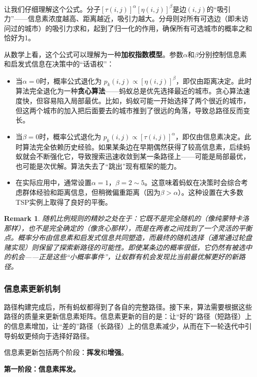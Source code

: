 \documentclass[lang=cn,zihao=-4,a4paper,fontset=windows]{beautybook}
\newtheorem*{remark}{\textbf{Remark}}
\begin{document}
让我们仔细理解这个公式。分子$[\tau(i,j)]^\alpha [\eta(i,j)]^\beta$是边$(i,j)$的“吸引力”——信息素浓度越高、距离越近，吸引力越大。分母则对所有可选边（即未访问过的城市）的吸引力求和，起到了归一化的作用，确保所有可选城市的概率之和恰好为1。

从数学上看，这个公式可以理解为一种\textbf{加权指数模型}。参数$\alpha$和$\beta$分别控制信息素和启发式信息在决策中的“话语权”：
\begin{itemize}
    \item 当$\alpha = 0$时，概率公式退化为 $p_k(i,j) \propto [\eta(i,j)]^\beta$，即仅由距离决定。此时算法完全退化为一种\textbf{贪心算法}——蚂蚁总是优先选择最近的城市。贪心算法速度快，但容易陷入局部最优。比如，蚂蚁可能一开始选择了两个很近的城市，但这两个城市的加入把后面要去的城市推到了很远的角落，导致总路径反而变长。
    \item 当$\beta = 0$时，概率公式退化为 $p_k(i,j) \propto [\tau(i,j)]^\alpha$，即仅由信息素决定。此时算法完全依赖历史经验。如果某条边在早期偶然获得了较高信息素，后续蚂蚁就会不断强化它，导致搜索迅速收敛到某一条路径上——可能是局部最优，也可能是次优解。算法失去了“跳出”现有框架的能力。
    \item 在实际应用中，通常设置$\alpha = 1$，$\beta = 2\sim5$。这意味着蚂蚁在决策时会综合考虑群体经验和距离信息，但稍微偏重距离（因为$\beta > \alpha$）。这种设置在大多数TSP实例上取得了良好的平衡。
\end{itemize}

\begin{remark}
随机比例规则的精妙之处在于：它既不是完全随机的（像纯蒙特卡洛那样），也不是完全确定的（像贪心那样），而是在两者之间找到了一个灵活的平衡点。概率分布由信息素和启发式信息共同塑造，而最终的随机选择（通常通过轮盘赌实现）则保留了探索新路径的可能性。即使某条边的概率很低，它仍然有被选中的机会——正是这些“小概率事件”，让蚁群有机会发现比当前最优解更好的新路径。
\end{remark}

\subsubsection{信息素更新机制}

路径构建完成后，所有蚂蚁都得到了各自的完整路径。接下来，算法需要根据这些路径的质量来更新信息素矩阵。信息素更新的目的是：让“好的”路径（短路径）上的信息素增加，让“差的”路径（长路径）上的信息素减少，从而在下一轮迭代中引导蚂蚁更倾向于选择好路径。

信息素更新包括两个阶段：\textbf{挥发}和\textbf{增强}。

\textbf{第一阶段：信息素挥发。}
\end{document}
